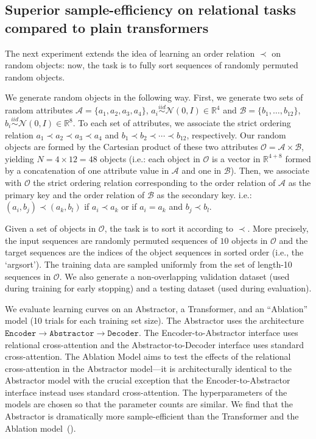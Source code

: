 \subsection{Superior sample-efficiency on relational tasks compared to plain transformers}
The next experiment extends the idea of learning an order relation $\prec$ on random objects: now, the task is to fully sort sequences of randomly permuted random objects.

We generate random objects in the following way. First, we generate two sets of random attributes $\mathcal{A} = \{a_1, a_2, a_3, a_4\}$, $a_i \overset{iid}{\sim} \mathcal{N}(0, I) \in \mathbb{R}^{4}$ and $\mathcal{B} = \{b_1, \ldots, b_{12}\}$, $b_i \overset{iid}{\sim} \mathcal{N}(0, I) \in \mathbb{R}^{8}$. To each set of attributes, we associate the strict ordering relation $a_1 \prec a_2 \prec a_3 \prec a_4$ and $b_1 \prec b_2 \prec \cdots \prec b_{12}$, respectively. Our random objects are formed by the Cartesian product of these two attributes $\mathcal{O} = \mathcal{A} \times \mathcal{B}$, yielding $N = 4 \times 12 = 48$ objects (i.e.: each object in $\mathcal{O}$ is a vector in $\mathbb{R}^{4+8}$ formed by a concatenation of one attribute value in $\mathcal{A}$ and one in $\mathcal{B}$). Then, we associate with $\mathcal{O}$ the strict ordering relation corresponding to the order relation of $\mathcal{A}$ as the primary key and the order relation of $\mathcal{B}$ as the secondary key. i.e.: $(a_i, b_j) \prec (a_k, b_l)$ if $a_i \prec a_k$ or if $a_i = a_k$ and $b_j \prec b_l$.

Given a set of objects in $\mathcal{O}$, the task is to sort it according to $\prec$. More precisely, the input sequences are randomly permuted sequences of $10$ objects in $\mathcal{O}$ and the target sequences are the indices of the object sequences in sorted order (i.e., the `argsort'). The training data are sampled uniformly from the set of length-10 sequences in $\mathcal{O}$. We also generate a non-overlapping validation dataset (used during training for early stopping) and a testing dataset (used during evaluation).

We evaluate learning curves on an Abstractor, a Transformer, and an ``Ablation'' model (10 trials for each training set size). The Abstractor uses the architecture $\texttt{Encoder} \to \texttt{Abstractor} \to \texttt{Decoder}$. The Encoder-to-Abstractor interface uses relational cross-attention and the Abstractor-to-Decoder interface uses standard cross-attention. The Ablation Model aims to test the effects of the relational cross-attention in the Abstractor model---it is architecturally identical to the Abstractor model with the crucial exception that the Encoder-to-Abstractor interface instead uses standard cross-attention. The hyperparameters of the models are chosen so that the parameter counts are similar. %
We find that the Abstractor is dramatically more sample-efficient than the Transformer and the Ablation model~().


